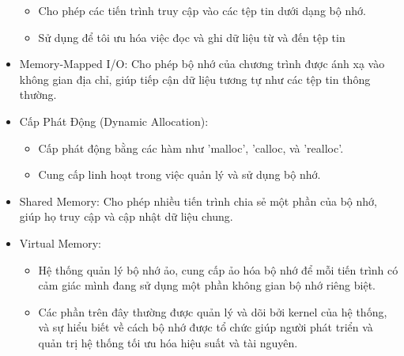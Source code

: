\documentclass[12pt,a4paper]{article}
\begin{document}
\begin{itemize}
	\begin{itemize}
		\item Cho phép các tiến trình truy cập vào các tệp tin dưới dạng bộ nhớ.
		\item Sử dụng để tôi ưu hóa việc đọc và ghi dữ liệu từ và đến tệp tin
	\end{itemize}
	\item Memory-Mapped I/O: Cho phép bộ nhớ của chương trình được ánh xạ vào không gian địa chỉ, giúp tiếp cận dữ liệu tương tự như các tệp tin thông thường.
	\item Cấp Phát Động (Dynamic Allocation):
	\begin{itemize}
		\item Cấp phát động bằng các hàm như 'malloc', 'calloc, và 'realloc'.
		\item Cung cấp linh hoạt trong việc quản lý và sử dụng bộ nhớ.
	\end{itemize}
	\item Shared Memory: Cho phép nhiều tiến trình chia sẻ một phần của bộ nhớ, giúp họ truy cập và cập nhật dữ liệu chung.
	\item Virtual Memory:
	\begin{itemize}
		\item Hệ thống quản lý bộ nhớ ảo, cung cấp ảo hóa bộ nhớ để mỗi tiến trình có cảm giác mình đang sử dụng một phần không gian bộ nhớ riêng biệt.
		\item Các phần trên đây thường được quản lý và dõi bởi kernel của hệ thống, và sự hiểu biết về cách bộ nhớ được tổ chức giúp người phát triển và quản trị hệ thống tối ưu hóa hiệu suất và tài nguyên.
	\end{itemize}
\end{itemize}
\end{document}
